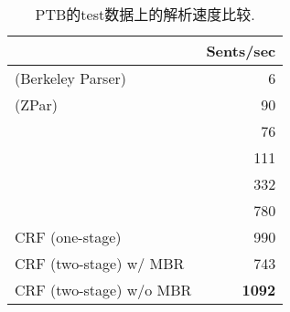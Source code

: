 \begin{table}[tb]
    \setlength{\tabcolsep}{15pt}
    \centering
    \begin{tabular}{lr}
        \toprule
                                                             & Sents/sec     \\
        \midrule
        \cite{petrov-klein-2007-improved}  (Berkeley Parser) & 6             \\
        \cite{zhu-etal-2013-fast} (ZPar)                     & 90            \\
        \cite{stern-etal-2017-minimal}                       & 76            \\
        \cite{shen-etal-2018-straight}                       & 111           \\
        \cite{kitaev-klein-2018-constituency}                & 332           \\
        \cite{gomez-rodriguez-vilares-2018-constituent}      & 780           \\[3pt]
        CRF (one-stage)                                      & 990           \\
        CRF (two-stage) w/ MBR                               & 743           \\
        CRF (two-stage) w/o MBR                              & \textbf{1092} \\

        \bottomrule
    \end{tabular}
    \caption{PTB的test数据上的解析速度比较.}
    \label{table:speed}
\end{table}